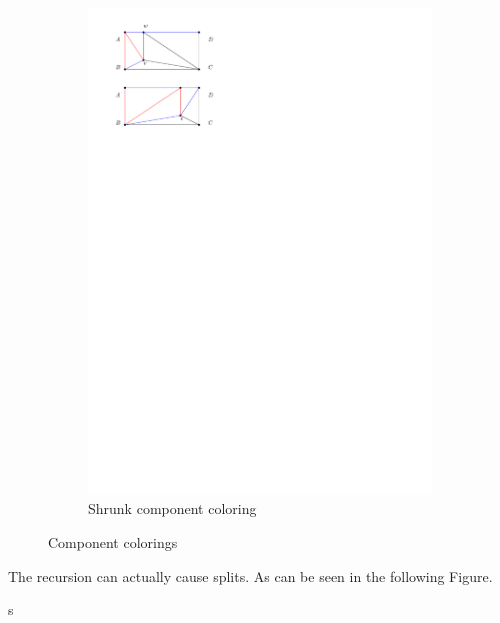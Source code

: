 \begin{figure}
\begin{subfigure}[b]{0.45 \textwidth}
        \includegraphics[width =\textwidth]{chordShrink/img/shrunkColoring}
        \caption{Shrunk component coloring}
        \label{fig:chord:shrunkColoring}
    \end{subfigure}
    \caption{Component colorings}
\end{figure}


The recursion can actually cause splits. As can be seen in the following Figure.



s
